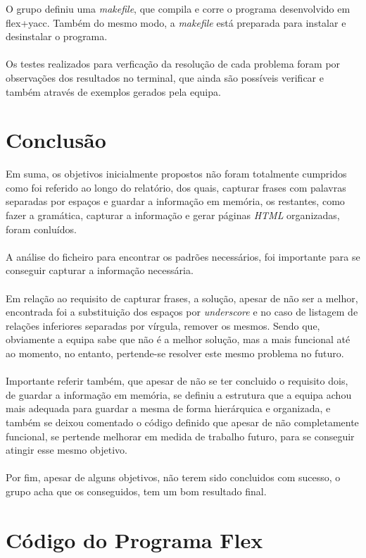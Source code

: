 \documentclass[11pt,a4paper]{report}%
\begin{document}
O grupo definiu uma \emph{makefile}, que compila e corre o programa desenvolvido em flex+yacc. Também do mesmo modo, a \emph{makefile} está preparada para instalar e desinstalar o programa.\\\\
Os testes realizados para verficação da resolução de cada problema foram por observações dos resultados no terminal, que ainda são possíveis verificar e também através de exemplos gerados pela equipa.

\chapter{Conclusão}
Em suma, os objetivos inicialmente propostos não foram totalmente cumpridos como foi referido ao longo do relatório, dos quais, capturar frases com palavras separadas por espaços e guardar a informação em memória, os restantes, como fazer a gramática, capturar a informação e gerar páginas \emph{HTML} organizadas, foram conluídos.
\\\\A análise do ficheiro para encontrar os padrões necessários, foi importante para se conseguir capturar a informação necessária.
\\\\Em relação ao requisito de capturar frases, a solução, apesar de não ser a melhor, encontrada foi a substituição dos espaços por \emph{underscore} e no caso de listagem de relações inferiores separadas por vírgula, remover os mesmos. Sendo que, obviamente a equipa sabe que não é a melhor solução, mas a mais funcional até ao momento, no entanto, pertende-se resolver este mesmo problema no futuro.
\\\\ Importante referir também, que apesar de não se ter concluido o requisito dois, de guardar a informação em memória, se definiu a estrutura que a equipa achou mais adequada para guardar a mesma de forma hierárquica e organizada, e também se deixou comentado o código definido que apesar de não completamente funcional, se pertende melhorar em medida de trabalho futuro, para se conseguir atingir esse mesmo objetivo.\\\\
Por fim, apesar de alguns objetivos, não terem sido concluidos com sucesso, o grupo acha que os conseguidos, tem um bom resultado final.
\appendix %
\chapter{Código do Programa Flex}
\end{document}
